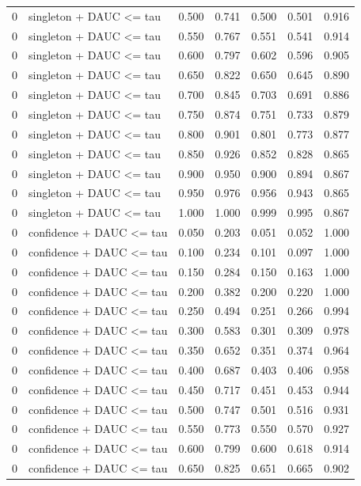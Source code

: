 \begin{tabular}{rlrrrrr}
0 & singleton + DAUC <= tau & 0.500 & 0.741 & 0.500 & 0.501 & 0.916 \\
0 & singleton + DAUC <= tau & 0.550 & 0.767 & 0.551 & 0.541 & 0.914 \\
0 & singleton + DAUC <= tau & 0.600 & 0.797 & 0.602 & 0.596 & 0.905 \\
0 & singleton + DAUC <= tau & 0.650 & 0.822 & 0.650 & 0.645 & 0.890 \\
0 & singleton + DAUC <= tau & 0.700 & 0.845 & 0.703 & 0.691 & 0.886 \\
0 & singleton + DAUC <= tau & 0.750 & 0.874 & 0.751 & 0.733 & 0.879 \\
0 & singleton + DAUC <= tau & 0.800 & 0.901 & 0.801 & 0.773 & 0.877 \\
0 & singleton + DAUC <= tau & 0.850 & 0.926 & 0.852 & 0.828 & 0.865 \\
0 & singleton + DAUC <= tau & 0.900 & 0.950 & 0.900 & 0.894 & 0.867 \\
0 & singleton + DAUC <= tau & 0.950 & 0.976 & 0.956 & 0.943 & 0.865 \\
0 & singleton + DAUC <= tau & 1.000 & 1.000 & 0.999 & 0.995 & 0.867 \\
0 & confidence + DAUC <= tau & 0.050 & 0.203 & 0.051 & 0.052 & 1.000 \\
0 & confidence + DAUC <= tau & 0.100 & 0.234 & 0.101 & 0.097 & 1.000 \\
0 & confidence + DAUC <= tau & 0.150 & 0.284 & 0.150 & 0.163 & 1.000 \\
0 & confidence + DAUC <= tau & 0.200 & 0.382 & 0.200 & 0.220 & 1.000 \\
0 & confidence + DAUC <= tau & 0.250 & 0.494 & 0.251 & 0.266 & 0.994 \\
0 & confidence + DAUC <= tau & 0.300 & 0.583 & 0.301 & 0.309 & 0.978 \\
0 & confidence + DAUC <= tau & 0.350 & 0.652 & 0.351 & 0.374 & 0.964 \\
0 & confidence + DAUC <= tau & 0.400 & 0.687 & 0.403 & 0.406 & 0.958 \\
0 & confidence + DAUC <= tau & 0.450 & 0.717 & 0.451 & 0.453 & 0.944 \\
0 & confidence + DAUC <= tau & 0.500 & 0.747 & 0.501 & 0.516 & 0.931 \\
0 & confidence + DAUC <= tau & 0.550 & 0.773 & 0.550 & 0.570 & 0.927 \\
0 & confidence + DAUC <= tau & 0.600 & 0.799 & 0.600 & 0.618 & 0.914 \\
0 & confidence + DAUC <= tau & 0.650 & 0.825 & 0.651 & 0.665 & 0.902 \\

\end{tabular}
